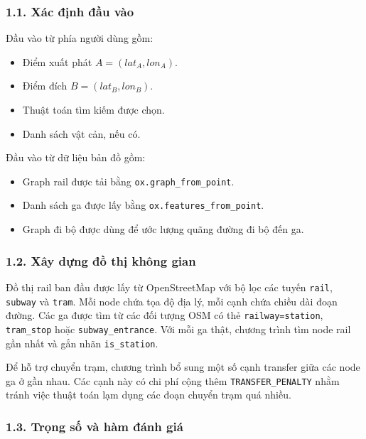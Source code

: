 \documentclass[12pt,a4paper]{article}
\begin{document}
\subsubsection*{1.1. Xác định đầu vào}

Đầu vào từ phía người dùng gồm:
\begin{itemize}
    \item Điểm xuất phát $A=(lat_A, lon_A)$.
    \item Điểm đích $B=(lat_B, lon_B)$.
    \item Thuật toán tìm kiếm được chọn.
    \item Danh sách vật cản, nếu có.
\end{itemize}

Đầu vào từ dữ liệu bản đồ gồm:
\begin{itemize}
    \item Graph rail được tải bằng \texttt{ox.graph\_from\_point}.
    \item Danh sách ga được lấy bằng \texttt{ox.features\_from\_point}.
    \item Graph đi bộ được dùng để ước lượng quãng đường đi bộ đến ga.
\end{itemize}

\subsubsection*{1.2. Xây dựng đồ thị không gian}

Đồ thị rail ban đầu được lấy từ OpenStreetMap với bộ lọc các tuyến \texttt{rail}, \texttt{subway} và \texttt{tram}. Mỗi node chứa tọa độ địa lý, mỗi cạnh chứa chiều dài đoạn đường. Các ga được tìm từ các đối tượng OSM có thẻ \texttt{railway=station}, \texttt{tram\_stop} hoặc \texttt{subway\_entrance}. Với mỗi ga thật, chương trình tìm node rail gần nhất và gắn nhãn \texttt{is\_station}.

Để hỗ trợ chuyển trạm, chương trình bổ sung một số cạnh transfer giữa các node ga ở gần nhau. Các cạnh này có chi phí cộng thêm \texttt{TRANSFER\_PENALTY} nhằm tránh việc thuật toán lạm dụng các đoạn chuyển trạm quá nhiều.

\subsubsection*{1.3. Trọng số và hàm đánh giá}
\end{document}
